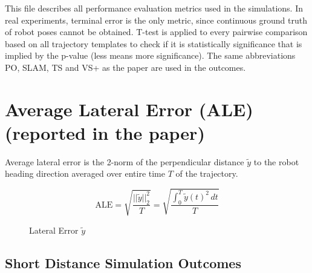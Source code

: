 \documentclass[11pt]{article}
\begin{document}
This file describes all performance evaluation metrics used in the simulations. 
In real experiments, terminal error is the only metric, since continuous 
ground truth of robot poses cannot be obtained. 
T-test is applied to every pairwise comparison based on all trajectory 
templates to check if it is statistically 
significance that is implied by the p-value (less means more significance).
The same abbreviations PO, SLAM, TS and VS+ as the paper 
are used in the outcomes.

\section{Average Lateral Error (ALE) (reported in the paper)}
Average lateral error is the 2-norm of the perpendicular distance $\tilde{y}$
to the robot heading direction averaged over entire time $T$ of the trajectory. 
\begin{figure}[h]
  \begin{minipage}{0.5\textwidth}
  \begin{equation} \label{eq:ale}
    \text{ALE} = \sqrt{\frac{||\tilde{y}||_2^2}{T}} 
    = \sqrt{\frac{\int_{0}^{T} \tilde{y}(t)^2 \,dt}{T}}
  \end{equation}
  \end{minipage}
  \hfill
  \begin{minipage}{0.49\textwidth}
    \vspace*{0.06in}
    \centering
    \vspace*{-7pt}
    \caption{Lateral Error $\tilde{y}$ \label{fig:ale}}
  \end{minipage}  
  \vspace*{-0.5em}
\end{figure}

\subsection{Short Distance Simulation Outcomes}
\end{document}
